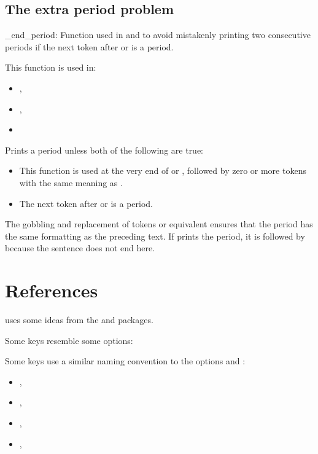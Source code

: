 \documentclass{beerydoc}
\begin{document}
\subsection{The extra period problem}
\label{subsec:extraperiod}

\begin{codedoc}{\clockdate_end_period:}
  Function used in  and  to avoid mistakenly
  printing two consecutive periods if the next token after  or
   is a period.

  This function is used in:
  \begin{itemize}
    \item {}, 
    \item {}, 
    \item {}
  \end{itemize}

  Prints a period unless both of the following are true:
  \begin{itemize}
    \item
    This function is used at the very end of  or ,
    followed by zero or more tokens with the same meaning as .
    \item The next token after  or  is a period.
  \end{itemize}

  The gobbling and replacement of  tokens or equivalent ensures
  that the period has the same formatting as the preceding text.
  If  prints the period, it is followed by 
  because the sentence does not end here.
\end{codedoc}


\section{References}
\label{sec:ref}

 uses some ideas from the  and 
packages.

Some  keys resemble some  options:\nopagebreak


\listheading
  {
    Some  keys use a similar naming convention to the
     options  and
    :
  }
\begin{itemize}
  \item {}, 
  \item {}, 
  \item {}, 
  \item {}, 
\end{itemize}
\end{document}
